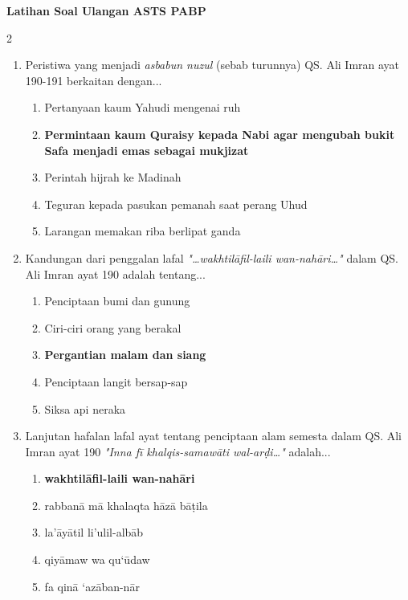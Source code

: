 \documentclass[10pt,a4paper]{article}
\begin{document}
\begin{center}
  \textbf{\Large Latihan Soal Ulangan ASTS PABP}
\end{center}
\vspace{0.3cm}

\begin{multicols}{2}
  
  \begin{enumerate}
    \item Peristiwa yang menjadi \textit{asbabun nuzul} (sebab turunnya) QS. Ali Imran ayat 190-191 berkaitan dengan...
    \begin{enumerate}
      \item Pertanyaan kaum Yahudi mengenai ruh
      \item \textbf{Permintaan kaum Quraisy kepada Nabi agar mengubah bukit Safa menjadi emas sebagai mukjizat}
      \item Perintah hijrah ke Madinah
      \item Teguran kepada pasukan pemanah saat perang Uhud
      \item Larangan memakan riba berlipat ganda
    \end{enumerate}

    \item Kandungan dari penggalan lafal \textit{"\dots wakhtilāfil-laili wan-nahāri\dots"} dalam QS. Ali Imran ayat 190 adalah tentang...
    \begin{enumerate}
      \item Penciptaan bumi dan gunung
      \item Ciri-ciri orang yang berakal
      \item \textbf{Pergantian malam dan siang}
      \item Penciptaan langit bersap-sap
      \item Siksa api neraka
    \end{enumerate}

    \item Lanjutan hafalan lafal ayat tentang penciptaan alam semesta dalam QS. Ali Imran ayat 190 \textit{"Inna fī khalqis-samawāti wal-arḍi\dots"} adalah...
    \begin{enumerate}
      \item \textbf{wakhtilāfil-laili wan-nahāri}
      \item rabbanā mā khalaqta hāzā bāṭila
      \item la’āyātil li’ulil-albāb
      \item qiyāmaw wa qu‘ūdaw 
      \item fa qinā ‘azāban-nār
    \end{enumerate}


\end{enumerate}
\end{multicols}
\end{document}
